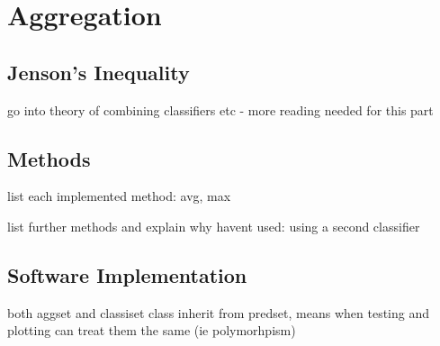 \section{Aggregation}
\label{sec:pl-agg}
    
    \subsection{Jenson's Inequality}
    \label{subsec:pl-agg-jenson}
        \begin{sitemize}
            \item{go into theory of combining classifiers etc - more reading needed for this part}
        \end{sitemize}
    
    \subsection{Methods}
    \label{subsec:pl-agg-methods}
        \begin{sitemize}
            \item{list each implemented method: avg, max}
            \item{list further methods and explain why havent used: using a second classifier}
        \end{sitemize}
        
    \subsection{Software Implementation}
    \label{subsec:pl-agg-software}
        \begin{sitemize}
            \item{both aggset and classiset class inherit from predset, means when testing and plotting can treat them the same (ie polymorhpism)}
        \end{sitemize}